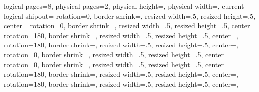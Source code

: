\usepackage{pgfmorepages}
\usepackage{atbegshi}           %

{%
  \edef\pgfpageoptionheight{\the\paperheight}
  \edef\pgfpageoptionwidth{\the\paperwidth}
  \def\pgfpageoptionborder{0pt}
  \def\pgfpageoptionfirstshipout{1}
}%
{%
  \pgfpagesphysicalpageoptions%
  {%
    logical pages=8,%
    physical pages=2,%
    physical height=\pgfpageoptionheight,%
    physical width=\pgfpageoptionwidth,%
    current logical shipout=\pgfpageoptionfirstshipout%
  }
  {%
    rotation=0,
    border shrink=\pgfpageoptionborder,%
    resized width=.5\pgfphysicalwidth,%
    resized height=.5\pgfphysicalheight,%
    center=\pgfpoint{.25\pgfphysicalwidth}{.75\pgfphysicalheight}%
  }%
  {%
    rotation=0,
    border shrink=\pgfpageoptionborder,%
    resized width=.5\pgfphysicalwidth,%
    resized height=.5\pgfphysicalheight,%
    center=\pgfpoint{.75\pgfphysicalwidth}{.75\pgfphysicalheight}%
  }%
  {%
    rotation=180,
    border shrink=\pgfpageoptionborder,%
    resized width=.5\pgfphysicalwidth,%
    resized height=.5\pgfphysicalheight,%
    center=\pgfpoint{.25\pgfphysicalwidth}{.25\pgfphysicalheight},%
  }%
  {%
    rotation=180,
    border shrink=\pgfpageoptionborder,%
    resized width=.5\pgfphysicalwidth,%
    resized height=.5\pgfphysicalheight,%
    center=\pgfpoint{.75\pgfphysicalwidth}{.25\pgfphysicalheight},%
  }%
  {%
    rotation=0,
    border shrink=\pgfpageoptionborder,%
    resized width=.5\pgfphysicalwidth,%
    resized height=.5\pgfphysicalheight,%
    center=\pgfpoint{.25\pgfphysicalwidth}{.75\pgfphysicalheight}%
  }%
  {%
    rotation=0,
    border shrink=\pgfpageoptionborder,%
    resized width=.5\pgfphysicalwidth,%
    resized height=.5\pgfphysicalheight,%
    center=\pgfpoint{.75\pgfphysicalwidth}{.75\pgfphysicalheight}%
  }%
  {%
    rotation=180,
    border shrink=\pgfpageoptionborder,%
    resized width=.5\pgfphysicalwidth,%
    resized height=.5\pgfphysicalheight,%
    center=\pgfpoint{.25\pgfphysicalwidth}{.25\pgfphysicalheight},%
  }%
  {%
    rotation=180,
    border shrink=\pgfpageoptionborder,%
    resized width=.5\pgfphysicalwidth,%
    resized height=.5\pgfphysicalheight,%
    center=\pgfpoint{.75\pgfphysicalwidth}{.25\pgfphysicalheight},%
  }%
}

